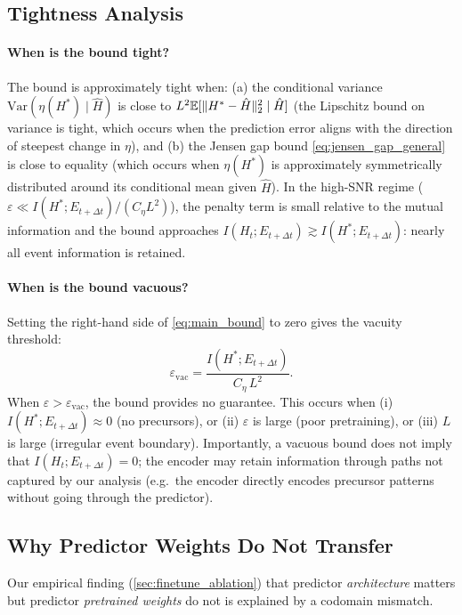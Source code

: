 \subsection{Tightness Analysis}

\paragraph{When is the bound tight?}
The bound is approximately tight when: (a) the conditional variance $\mathrm{Var}(\eta(H^*) \mid \hat{H})$ is close to $L^2 \mathbb{E}[\|H^* - \hat{H}\|_2^2 \mid \hat{H}]$ (the Lipschitz bound on variance is tight, which occurs when the prediction error aligns with the direction of steepest change in $\eta$), and (b) the Jensen gap bound \eqref{eq:jensen_gap_general} is close to equality (which occurs when $\eta(H^*)$ is approximately symmetrically distributed around its conditional mean given $\hat{H}$).
In the high-SNR regime ($\varepsilon \ll I(H^*; E_{t+\Delta t}) / (C_\eta L^2)$), the penalty term is small relative to the mutual information and the bound approaches $I(H_t; E_{t+\Delta t}) \gtrsim I(H^*; E_{t+\Delta t})$: nearly all event information is retained.

\paragraph{When is the bound vacuous?}
Setting the right-hand side of \eqref{eq:main_bound} to zero gives the vacuity threshold:
\begin{equation}
  \varepsilon_{\mathrm{vac}} = \frac{I(H^*; E_{t+\Delta t})}{C_\eta\,L^2}.
\end{equation}
When $\varepsilon > \varepsilon_{\mathrm{vac}}$, the bound provides no guarantee. This occurs when (i) $I(H^*; E_{t+\Delta t}) \approx 0$ (no precursors), or (ii) $\varepsilon$ is large (poor pretraining), or (iii) $L$ is large (irregular event boundary).
Importantly, a vacuous bound does not imply that $I(H_t; E_{t+\Delta t}) = 0$; the encoder may retain information through paths not captured by our analysis (e.g.\ the encoder directly encodes precursor patterns without going through the predictor).

\subsection{Why Predictor Weights Do Not Transfer}
\label{app:predictor_transfer}

Our empirical finding (\cref{sec:finetune_ablation}) that predictor \emph{architecture} matters but predictor \emph{pretrained weights} do not is explained by a codomain mismatch.

